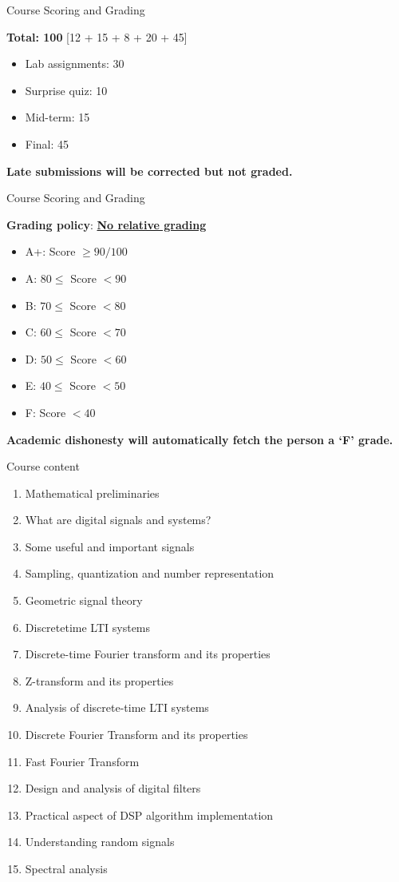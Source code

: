 \documentclass{beamer}
\begin{document}
\begin{frame}[t]{Course Scoring and Grading}

\textbf{Total: 100} [12 + 15 + 8 + 20 + 45]
\begin{itemize}
\item Lab assignments: 30
\item Surprise quiz: 10
\item Mid-term: 15
\item Final: 45
\end{itemize}
\textbf{Late submissions will be corrected but not graded.}
\end{frame}

\begin{frame}[t]{Course Scoring and Grading}

\textbf{Grading policy}: \textbf{\ul{No relative grading}}
\begin{itemize}
\item A+: Score $\geq 90/100$
\item A: $80 \leq$ Score $< 90$
\item B: $70 \leq$ Score $< 80$
\item C: $60 \leq$ Score $< 70$
\item D: $50 \leq$ Score $< 60$
\item E: $40 \leq$ Score $< 50$
\item F: Score $< 40$
\end{itemize}
\textbf{Academic dishonesty will automatically fetch the person a `F' grade.}
\end{frame}

\begin{frame}{Course content}
\begingroup
    \fontsize{9pt}{12pt}\selectfont
    \begin{enumerate}
    \item Mathematical preliminaries
    \item What are digital signals and systems?
    \item Some useful and important signals
    \item Sampling, quantization and number representation
    \item Geometric signal theory
    \item Discrete­time LTI systems
    \item Discrete­-time Fourier transform and its properties
    \item Z-­transform and its properties
    \item Analysis of discrete-­time LTI systems
    \item Discrete Fourier Transform and its properties
    \item Fast Fourier Transform
    \item Design and analysis of digital filters
    \item Practical aspect of DSP algorithm implementation
    \item Understanding random signals
    \item Spectral analysis
    \end{enumerate}  
\endgroup
\end{frame}
\end{document}
